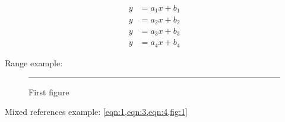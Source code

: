 \documentclass[11pt]{article}
\begin{document}
\begin{align}
y&=a_1x+b_1\label{eqn:1}\\
y&=a_2x+b_2\label{eqn:2}\\
y&=a_3x+b_3\label{eqn:3}\\
y&=a_4x+b_4\label{eqn:4}
\end{align}

\noindent
Range example: 

\begin{figure}[ht]\centering\rule{0.5\linewidth}{0.1\linewidth}\caption{First figure}\label{fig:1}\end{figure}

\noindent
Mixed references example: \cref{eqn:1,eqn:3,eqn:4,fig:1}
\end{document}
